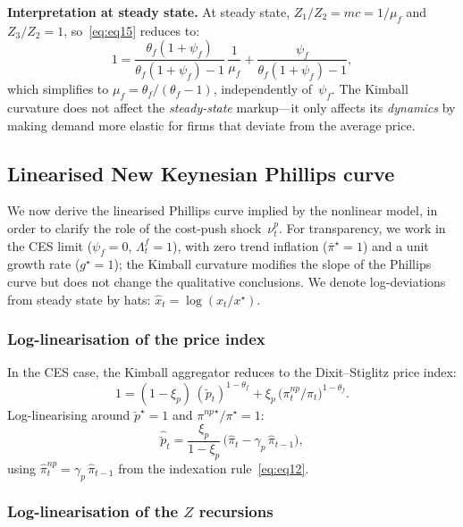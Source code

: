 \documentclass[11pt,a4paper]{article}
\newcommand{\bbar}[1]{\bar{#1}}
\renewcommand{\ss}{\star}
\begin{document}
\medskip
\noindent\textbf{Interpretation at steady state.}
At steady state, $Z_{1}/Z_{2} = mc = 1/\mu_f$ and $Z_{3}/Z_{2} = 1$,
so~\eqref{eq:eq15} reduces to:
\[
  1 = \frac{\theta_f(1+\psi_f)}{\theta_f(1+\psi_f)-1}\,\frac{1}{\mu_f}
  + \frac{\psi_f}{\theta_f(1+\psi_f)-1},
\]
which simplifies to $\mu_f = \theta_f/(\theta_f - 1)$, independently
of~$\psi_f$. The Kimball curvature does not affect the
\emph{steady-state} markup---it only affects its \emph{dynamics} by
making demand more elastic for firms that deviate from the average price.

\subsection{Linearised New Keynesian Phillips curve}
\label{sec:linearised_nkpc}

We now derive the linearised Phillips curve implied by the nonlinear
model, in order to clarify the role of the cost-push shock~$\nu^p_t$.
For transparency, we work in the CES limit
($\psi_f = 0$, $\Lambda^f_t = 1$), with zero trend inflation
($\bbar\pi^{\star} = 1$) and a unit growth rate ($g^{\star} = 1$); the Kimball
curvature modifies the slope of the Phillips curve but does not change
the qualitative conclusions. We denote log-deviations from steady
state by hats: $\hat x_t = \log(x_t/x^\ss)$.

\subsubsection{Log-linearisation of the price index}

In the CES case, the Kimball aggregator reduces to the Dixit--Stiglitz
price index:
\[
  1 = (1-\xi_p)\,(\breve p_t)^{1-\theta_f}
  + \xi_p\,\bigl(\pi^{np}_t/\pi_t\bigr)^{1-\theta_f}.
\]
Log-linearising around $\breve p^\ss = 1$ and ${\pi^{np}}^\ss/\pi^\ss = 1$:
\begin{equation}\label{eq:pstar_lin}
  \hat{\breve p}_t = \frac{\xi_p}{1-\xi_p}\,
  \bigl(\hat\pi_t - \gamma_p\,\hat\pi_{t-1}\bigr),
\end{equation}
using $\hat\pi^{np}_t = \gamma_p\,\hat\pi_{t-1}$ from the
indexation rule~\eqref{eq:eq12}.

\subsubsection{Log-linearisation of the $Z$ recursions}
\end{document}
